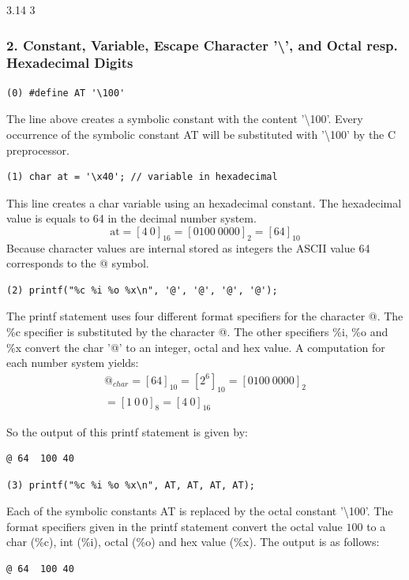 \documentclass[12pt]{article}
\begin{document}
3.14 3

\subsubsection*{2. Constant, Variable, Escape Character '\textbackslash', and Octal resp. Hexadecimal Digits}
\begin{lstlisting}
(0) #define AT '\100'
\end{lstlisting}
The line above creates a symbolic constant with the content '\textbackslash 100'.
Every occurrence of the symbolic constant AT will be substituted with '\textbackslash 100' by the C preprocessor.

\begin{lstlisting}
(1) char at = '\x40'; // variable in hexadecimal
\end{lstlisting}
This line creates a char variable using an hexadecimal constant. The hexadecimal value is equals to 64 in the decimal number system.
\begin{equation}
\text{at} = [4 \: 0]_{16} = [0100 \: 0000]_2 =  [64]_{10}
\end{equation} 
Because character values are internal stored as integers the ASCII value 64 corresponds to the @ symbol.
\\
\begin{lstlisting}
(2) printf("%c %i %o %x\n", '@', '@', '@', '@');
\end{lstlisting}
The printf statement uses four different format specifiers for the character @.
The \%c specifier is substituted by the character @. The other specifiers \%i, \%o and \%x convert the char '@' to an integer, octal and hex value. 
A computation for each number system yields:
\begin{equation}
\begin{split}
@_{char} = {[64]}_{10} = {[2^6]}_{10} = {[0100 \: 0000]}_2 \\
= [1 \: 0 \: 0]_{8} =[4 \: 0]_{16}
\end{split}
\end{equation}

So the output of this printf statement is given by:

\begin{lstlisting}
@ 64  100 40
\end{lstlisting}


\begin{lstlisting}
(3) printf("%c %i %o %x\n", AT, AT, AT, AT);
\end{lstlisting}
Each of the symbolic constants AT is replaced by the octal constant '\textbackslash 100'. The format specifiers given in the printf statement convert the octal value $100$ to a char (\%c), int (\%i), octal (\%o) and hex value (\%x). 
The output is as follows:
\begin{lstlisting}
@ 64  100 40
\end{lstlisting}
\end{document}
